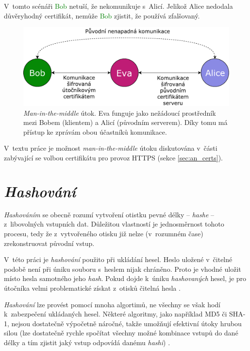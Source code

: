 V~tomto scénáři \textcolor{green}{Bob} netuší, že nekomunikuje s~\textcolor{blue2}{Alicí}. Jelikož \textcolor{blue2}{Alice} nedodala důvěryhodný certifikát, nemůže \textcolor{green}{Bob} zjistit, že používá zfalšovaný.

\begin{figure}[h!]
    \centering
    \includegraphics[width=\textwidth]{images/mitm.pdf}
    \caption[\textit{Man-in-the-middle} útok]{\textit{Man-in-the-middle} útok. Eva funguje jako nežádoucí prostředník mezi Bobem (klientem) a Alicí (původním serverem). Díky tomu má přístup ke zprávám obou účastníků komunikace. \cite{mitm}}
    \label{fig:mitm}
\end{figure}

V~textu práce je možnost \textit{man-in-the-middle} útoku diskutována v~části zabývající se volbou certifikátu pro provoz HTTPS (sekce \ref{sec:an_certs}).

\section{\textit{Hashování}}

\textit{Hashováním} se obecně rozumí vytvoření otistku pevné délky -- \textit{hashe} -- z~libovolných vstupních dat. Důležitou vlastností je jednosměrnost tohoto procesu, tedy že z~vytvořeného otisku již nelze (v~rozumném čase) zrekonstruovat původní vstup. \cite{hash_crackstation}

V~této práci je \textit{hashování} použito při ukládání hesel. Heslo uložené v~čitelné podobě není při úniku souboru s~heslem nijak chráněno. Proto je vhodné uložit místo hesla samotného jeho \textit{hash}. Pokud dojde k~úniku \textit{hashovaných} hesel, je pro útočníka velmi problematické získat z~otisků čitelná hesla \cite{hash_crackstation}.

\textit{Hashování} lze provést pomocí mnoha algortimů, ne všechny se však hodí k~zabezpečení ukládaných hesel. Některé algoritmy, jako například MD5 či SHA-1, nejsou dostatečně výpočetně náročné, takže umožňují efektivní útoky hrubou silou (lze dostatečně rychle spočítat všechny možné kombinace vstupů do dané délky a tím zjistit jaký vstup odpovídá danému \textit{hashi}) \cite{hash_crackstation}. 

